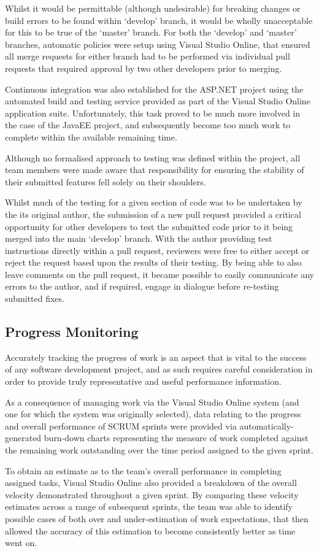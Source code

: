 Whilst it would be permittable (although undesirable) for breaking changes or build errors to be found within `develop' branch, it would be wholly unacceptable for this to be true of the `master' branch. For both the `develop' and `master' branches, automatic policies were setup using Visual Studio Online, that ensured all merge requests for either branch had to be performed via individual pull requests that required approval by two other developers prior to merging.

Continuous integration was also established for the ASP.NET project using the automated build and testing service provided as part of the Visual Studio Online application suite. Unfortunately, this task proved to be much more involved in the case of the JavaEE project, and subsequently become too much work to complete within the available remaining time. 


Although no formalised approach to testing was defined within the project, all team members were made aware that responsibility for ensuring the stability of their submitted features fell solely on their shoulders. 

Whilst much of the testing for a given section of code was to be undertaken by the its original author, the submission of a new pull request provided a critical opportunity for other developers to test the submitted code prior to it being merged into the main `develop' branch. With the author providing test instructions directly within a pull request, reviewers were free to either accept or reject the request based upon the results of their testing. By being able to also leave comments on the pull request, it became possible to easily communicate any errors to the author, and if required, engage in dialogue before re-testing submitted fixes.

\subsection{Progress Monitoring}

Accurately tracking the progress of work is an aspect that is vital to the success of any software development project, and as such requires careful consideration in order to provide truly representative and useful performance information. 

As a consequence of managing work via the Visual Studio Online system (and one for which the system was originally selected), data relating to the progress and overall performance of SCRUM sprints were provided via automatically-generated burn-down charts representing the measure of work completed against the remaining work outstanding over the time period assigned to the given sprint.

To obtain an estimate as to the team's overall performance in completing assigned tasks, Visual Studio Online also provided a breakdown of the overall velocity demonstrated throughout a given sprint. By comparing these velocity estimates across a range of subsequent sprints, the team was able to identify possible cases of both over and under-estimation of work expectations, that then allowed the accuracy of this estimation to become consistently better as time went on.


